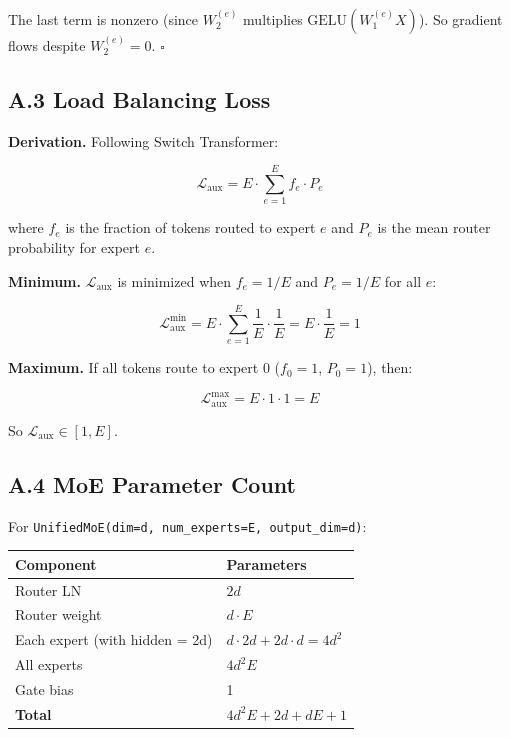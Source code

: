 The last term is nonzero (since $W_2^{(e)}$ multiplies $\text{GELU}(W_1^{(e)} X)$). 
So gradient flows despite $W_2^{(e)} = 0$. $\square$

\subsection{A.3 Load Balancing Loss}

\textbf{Derivation.} Following Switch Transformer:

\begin{equation}
\mathcal{L}_\text{aux} = E \cdot \sum_{e=1}^{E} f_e \cdot P_e
\end{equation}

where $f_e$ is the fraction of tokens routed to expert $e$ and $P_e$ is the 
mean router probability for expert $e$.

\textbf{Minimum.} $\mathcal{L}_\text{aux}$ is minimized when $f_e = 1/E$ and 
$P_e = 1/E$ for all $e$:

\begin{equation}
\mathcal{L}_\text{aux}^\text{min} = E \cdot \sum_{e=1}^{E} \frac{1}{E} \cdot \frac{1}{E} = E \cdot \frac{1}{E} = 1
\end{equation}

\textbf{Maximum.} If all tokens route to expert 0 ($f_0 = 1$, $P_0 = 1$), then:

\begin{equation}
\mathcal{L}_\text{aux}^\text{max} = E \cdot 1 \cdot 1 = E
\end{equation}

So $\mathcal{L}_\text{aux} \in [1, E]$.

\subsection{A.4 MoE Parameter Count}

For \texttt{UnifiedMoE(dim=d, num\_experts=E, output\_dim=d)}:

\begin{table}[H]
\centering
\small
\begin{tabular}{ll}
\toprule
\textbf{Component} & \textbf{Parameters} \\
\midrule
Router LN & $2d$ \\
Router weight & $d \cdot E$ \\
Each expert (with hidden = 2d) & $d \cdot 2d + 2d \cdot d = 4d^2$ \\
All experts & $4d^2 E$ \\
Gate bias & 1 \\
\textbf{Total} & $4d^2 E + 2d + dE + 1$ \\
\bottomrule
\end{tabular}
\end{table}

